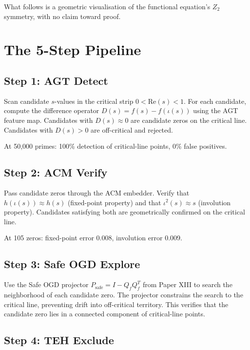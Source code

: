 \documentclass[11pt,a4paper]{article}
\begin{document}
What follows is a geometric visualisation of the functional equation's $Z_2$ symmetry, with no claim toward proof.

\section{The 5-Step Pipeline}

\subsection{Step 1: AGT Detect}

Scan candidate $s$-values in the critical strip $0 < \mathrm{Re}(s) < 1$. For each candidate, compute the difference operator $D(s) = f(s) - f(\iota(s))$ using the AGT feature map. Candidates with $D(s) \approx 0$ are candidate zeros on the critical line. Candidates with $D(s) > 0$ are off-critical and rejected.

At 50,000 primes: 100\% detection of critical-line points, 0\% false positives.

\subsection{Step 2: ACM Verify}

Pass candidate zeros through the ACM embedder. Verify that $h(\iota(s)) \approx h(s)$ (fixed-point property) and that $\iota^2(s) \approx s$ (involution property). Candidates satisfying both are geometrically confirmed on the critical line.

At 105 zeros: fixed-point error 0.008, involution error 0.009.

\subsection{Step 3: Safe OGD Explore}

Use the Safe OGD projector $P_{\text{safe}} = I - Q_f Q_f^T$ from Paper XIII to search the neighborhood of each candidate zero. The projector constrains the search to the critical line, preventing drift into off-critical territory. This verifies that the candidate zero lies in a connected component of critical-line points.

\subsection{Step 4: TEH Exclude}
\end{document}
